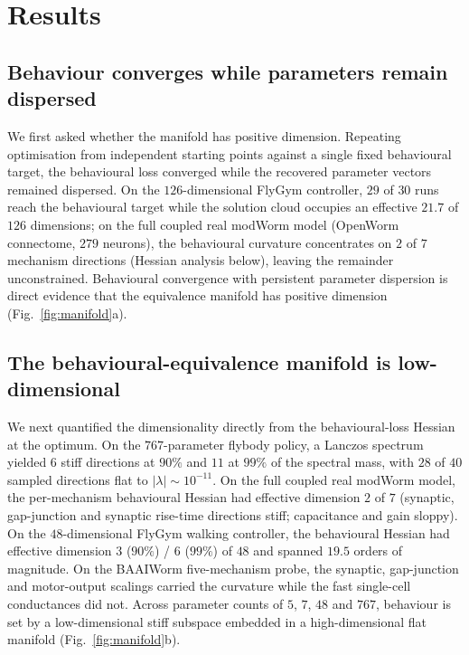 \documentclass[11pt]{article}
\begin{document}
\section*{Results}

\subsection*{Behaviour converges while parameters remain dispersed}
We first asked whether the manifold has positive dimension. Repeating optimisation from independent starting points against a single fixed behavioural target, the behavioural loss converged while the recovered parameter vectors remained dispersed. On the $126$-dimensional FlyGym controller, $29$ of $30$ runs reach the behavioural target while the solution cloud occupies an effective $21.7$ of $126$ dimensions; on the full coupled real modWorm model (OpenWorm connectome, $279$ neurons), the behavioural curvature concentrates on $2$ of $7$ mechanism directions (Hessian analysis below), leaving the remainder unconstrained. Behavioural convergence with persistent parameter dispersion is direct evidence that the equivalence manifold has positive dimension (Fig.~\ref{fig:manifold}a).

\subsection*{The behavioural-equivalence manifold is low-dimensional}
We next quantified the dimensionality directly from the behavioural-loss Hessian at the optimum. On the $767$-parameter flybody policy, a Lanczos spectrum yielded $6$ stiff directions at $90\%$ and $11$ at $99\%$ of the spectral mass, with $28$ of $40$ sampled directions flat to $|\lambda|\sim10^{-11}$. On the full coupled real modWorm model, the per-mechanism behavioural Hessian had effective dimension $2$ of $7$ (synaptic, gap-junction and synaptic rise-time directions stiff; capacitance and gain sloppy). On the $48$-dimensional FlyGym walking controller, the behavioural Hessian had effective dimension $3$ ($90\%$) / $6$ ($99\%$) of $48$ and spanned $19.5$ orders of magnitude. On the BAAIWorm five-mechanism probe, the synaptic, gap-junction and motor-output scalings carried the curvature while the fast single-cell conductances did not. Across parameter counts of $5$, $7$, $48$ and $767$, behaviour is set by a low-dimensional stiff subspace embedded in a high-dimensional flat manifold (Fig.~\ref{fig:manifold}b).
\end{document}
